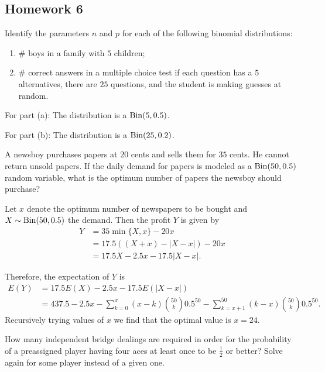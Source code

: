 \subsection{Homework 6}
\begin{problem}[Handout 8, \# 2]
  Identify the parameters \(n\) and \(p\) for each of the following
  binomial distributions:
  \begin{enumerate}[label=(\alph*),noitemsep]
  \item \(\#\) boys in a family with \(5\) children;
  \item \(\#\) correct answers in a multiple choice test if each
    question has a \(5\) alternatives, there are \(25\) questions, and the
    student is making guesses at random.
  \end{enumerate}
\end{problem}
\begin{solution}
  For part (a): The distribution is a \(\operatorname{Bin}(5,0.5)\).

  For part (b): The distribution is a \(\operatorname{Bin}(25,0.2)\).
\end{solution}

\begin{problem}[Handout 8, \# 10]
  A newsboy purchases papers at \(20\) cents and sells them for \(35\)
  cents. He cannot return unsold papers. If the daily demand for papers is
  modeled as a \(\operatorname{Bin}(50,0.5)\) random variable, what is the optimum
  number of papers the newsboy should purchase?
\end{problem}
\begin{solution}
  Let \(x\) denote the optimum number of newspapers to be bought and
  \(X\sim\operatorname{Bin}(50,0.5)\) the demand. Then the profit \(Y\) is given by
  \begin{align*}
    Y
    &=35\min\{X,x\}-20x\\
    &=17.5((X+x)-|X-x|)-20x\\
    &=17.5X-2.5x-17.5|X-x|.
  \end{align*}

  Therefore, the expectation of \(Y\) is
  \begin{align*}
    E(Y)
    &=17.5E(X)-2.5x-17.5E(|X-x|)\\
    &=437.5-2.5x-\sum_{k=0}^x(x-k)\binom{50}{k}0.5^{50}-\sum_{k=x+1}^{50}(k-x)\binom{50}{k}0.5^{50}.
  \end{align*}
  Recursively trying values of \(x\) we find that the optimal value is
  \(x=24\).
\end{solution}

\begin{problem}[Handout 8, \# 12]
  How many independent bridge dealings are required in order for the
  probability of a preassigned player having four aces at least once to be
  \(\frac{1}{2}\) or better? Solve again for some player instead of a given
  one.
\end{problem}
\begin{solution}
\end{solution}


